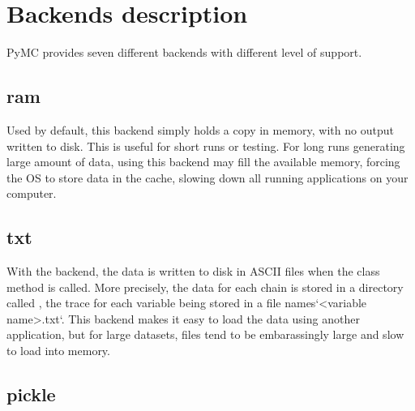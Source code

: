 \hypertarget{backends-description}{}
\section*{Backends description}
\label{backends-description}

PyMC provides seven different backends with different level of support.



\hypertarget{ram}{}
\subsection*{ram}
\label{ram}

Used by default, this backend simply holds a copy in memory, with no output written to disk. This is useful for short runs or testing. For long runs generating large amount of data, using this backend may fill the available memory, forcing the OS to store data in the cache, slowing down all running applications on your computer.



\hypertarget{txt}{}
\subsection*{txt}
\label{txt}

With the  backend, the data is written to disk in ASCII files when the class  method is called. More precisely, the data for each chain is stored in a directory called , the trace for each variable being stored in a file names`{\textless}variable name{\textgreater}.txt`. This backend makes it easy to load the data using another application, but for large datasets, files tend to be embarassingly large and slow to load into memory.



\hypertarget{pickle}{}
\subsection*{pickle}
\label{pickle}

